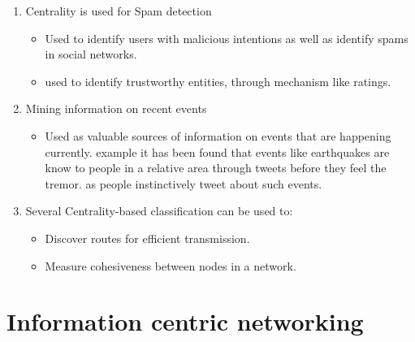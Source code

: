 \begin{enumerate}
\item Centrality is used for Spam detection
\begin{itemize}
\item Used to identify users with malicious intentions as well as identify spams in social networks.
\item used to identify trustworthy entities, through mechanism like ratings. 
\end{itemize}

\item Mining information on recent events
\begin{itemize}
\item Used as valuable sources of information on events that are happening currently.  example it has been found that events like earthquakes are know to people in a relative area through tweets before they feel the tremor. as people instinctively tweet about such events. 
\end{itemize}

\item Several Centrality-based classification can be used to:
\begin{itemize}
\item Discover routes for efficient transmission.
\item Measure cohesiveness between nodes in a network. 
\end{itemize}
\end{enumerate}

\section{Information centric networking}

